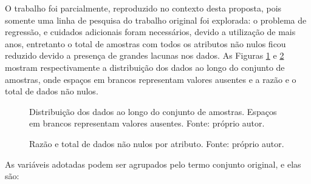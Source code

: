 O trabalho \cite{REZENDE:2009} foi parcialmente, reproduzido no contexto desta proposta, pois somente uma linha de pesquisa do trabalho original foi explorada: o problema de regressão, e cuidados adicionais foram necessários, devido a utilização de mais anos, entretanto o total de amostras com todos os atributos não nulos ficou reduzido devido a presença de grandes lacunas nos dados. As Figuras \ref{fig:distribution} e \ref{fig:nulltotal} mostram respectivamente a distribuição dos dados ao longo do conjunto de amostras, onde espaços em brancos representam valores ausentes e a razão e o total de dados não nulos.

\begin{figure}[H]
\centering
{}
\caption{Distribuição dos dados ao longo do conjunto de amostras. Espaços em brancos representam valores ausentes. Fonte: próprio autor.}
\label{fig:distribution}
\end{figure}

\begin{figure}[H]
\centering
{}
\caption{Razão e total de dados não nulos por atributo. Fonte: próprio autor.}
\label{fig:nulltotal}
\end{figure}

As variáveis adotadas podem ser agrupados pelo termo conjunto original, e elas são:

